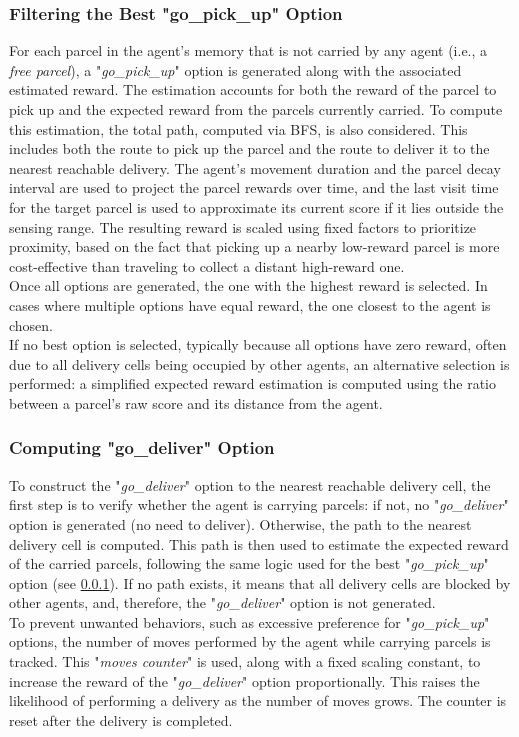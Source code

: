         \subsubsection{Filtering the Best "go\_pick\_up" Option}\label{best_pickup}
            For each parcel in the agent's memory that is not carried by any agent (i.e., a \textit{free parcel}), a "\textit{go\_pick\_up}" option is generated along with the associated estimated reward. The estimation accounts for both the reward of the parcel to pick up and the expected reward from the parcels currently carried. To compute this estimation, the total path, computed via BFS, is also considered. This includes both the route to pick up the parcel and the route to deliver it to the nearest reachable delivery. The agent's movement duration and the parcel decay interval are used to project the parcel rewards over time, and the last visit time for the target parcel is used to approximate its current score if it lies outside the sensing range. The resulting reward is scaled using fixed factors to prioritize proximity, based on the fact that picking up a nearby low-reward parcel is more cost-effective than traveling to collect a distant high-reward one.
            \medskip\\
            Once all options are generated, the one with the highest reward is selected. In cases where multiple options have equal reward, the one closest to the agent is chosen.
            \medskip\\
            If no best option is selected, typically because all options have zero reward, often due to all delivery cells being occupied by other agents, an alternative selection is performed: a simplified expected reward estimation is computed using the ratio between a parcel's raw score and its distance from the agent.

        \subsubsection{Computing "go\_deliver" Option}
            To construct the "\textit{go\_deliver}" option to the nearest reachable delivery cell, the first step is to verify whether the agent is carrying parcels: if not, no "\textit{go\_deliver}" option is generated (no need to deliver). Otherwise, the path to the nearest delivery cell is computed. This path is then used to estimate the expected reward of the carried parcels, following the same logic used for the best "\textit{go\_pick\_up}" option (see \ref{best_pickup}). If no path exists, it means that all delivery cells are blocked by other agents, and, therefore, the "\textit{go\_deliver}" option is not generated.
            \medskip\\
            To prevent unwanted behaviors, such as excessive preference for "\textit{go\_pick\_up}" options, the number of moves performed by the agent while carrying parcels is tracked. This "\textit{moves counter}" is used, along with a fixed scaling constant, to increase the reward of the "\textit{go\_deliver}" option proportionally. This raises the likelihood of performing a delivery as the number of moves grows. The counter is reset after the delivery is completed.

